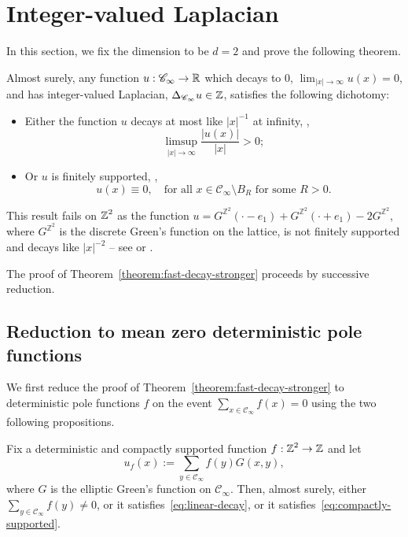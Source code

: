 \documentclass[12pt]{amsart}
\numberwithin{equation}{section}
\begin{document}
	\section{Integer-valued Laplacian} \label{sec:toppling-invariants}
	In this section, we fix the dimension to be $d = 2$ and prove the following theorem. 
	\begin{theorem} \label{theorem:fast-decay-stronger}
		Almost surely, any function $u: \mathscr{C}_{\infty} \to \operatorname{\mathbb{R}}$ which decays to 0,  $\lim_{|x| \to \infty} u(x) = 0$,
		and has integer-valued Laplacian,  $\Delta_{\mathscr{C}_{\infty}} u \in \operatorname{\mathbb{Z}}$, satisfies the following dichotomy:
		\begin{itemize}
			\item Either the function $u$ decays at most like $|x|^{-1}$ at infinity, \ie,
			\begin{equation} \label{eq:linear-decay}
				\limsup_{|x| \to \infty} \frac{|u(x)|}{|x|} > 0;
			\end{equation}
			\item Or $u$ is finitely supported, \ie, 
			\begin{equation} \label{eq:compactly-supported}
				u(x) \equiv 0, \quad \mbox{for all $x \in \mathscr{C}_{\infty} \setminus B_R$ for some $R > 0$}. 
			\end{equation}
		\end{itemize}
	\end{theorem}
	
	\begin{remark}
		This result fails on $\operatorname{\mathbb{Z}}^2$ as the function $u = G^{\mathbb{Z}^2}(\cdot - e_1) + G^{\mathbb{Z}^2}(\cdot + e_1) - 2 G^{\mathbb{Z}^2}$, where $G^{\mathbb{Z}^2}$ is the discrete Green's function on the lattice, is not finitely supported and decays like $|x|^{-2}$ -- see \cite{sandpiles-square-lattice} or \cite{schmidt-verbitskiy-2009}.
	\end{remark}
	
	
	The proof of Theorem~\ref{theorem:fast-decay-stronger} proceeds by successive reduction.
	
	\subsection{Reduction to mean zero deterministic pole functions}
	
	We first reduce the proof of Theorem~\ref{theorem:fast-decay-stronger} to deterministic pole functions $f$ on the event $\sum_{x \in \mathscr{C}_\infty} f(x) = 0$ using the two following propositions.
	\begin{prop} \label{prop:fast-decay-stronger}
		Fix a deterministic and compactly supported function $f : \operatorname{\mathbb{Z}}^2 \to \operatorname{\mathbb{Z}}$ and let 
		\begin{equation} \label{eq:green-potential}
			u_f(x) := \sum_{y \in \mathscr{C}_\infty} f(y) G(x , y),
		\end{equation}
		where $G$ is the elliptic Green's function on $\mathscr{C}_{\infty}$. 
		Then, almost surely, either $\sum_{y \in \mathscr{C}_\infty} f(y) \neq 0$, or it satisfies~\eqref{eq:linear-decay}, or it satisfies~\eqref{eq:compactly-supported}. 
	\end{prop}
	
\end{document}
